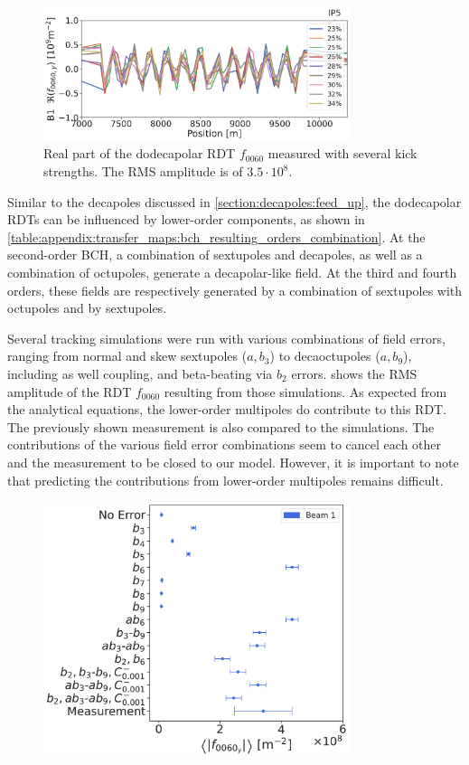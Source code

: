 \begin{figure}[!htb]
    \centering
    \includegraphics[width=0.8\textwidth]{./images/f0060y_all_meas_real.pdf}
    \caption{Real part of the dodecapolar RDT $f_{0060}$ measured with several kick strengths. The
    RMS amplitude is of $3.5\cdot10^{8}$.}
    \label{fig:high_orders:dodecapolar_f0060}
\end{figure}

Similar to the decapoles discussed in \cref{section:decapoles:feed_up}, the dodecapolar RDTs can be
influenced by lower-order components, as shown in
\cref{table:appendix:transfer_maps:bch_resulting_orders_combination}. At the second-order BCH, a
combination of sextupoles and decapoles, as well as a combination of octupoles, generate a
decapolar-like field. At the third and fourth orders, these fields are respectively generated by a
combination of sextupoles with octupoles and by sextupoles.

Several tracking simulations were run with various combinations of field errors, ranging from normal
and skew sextupoles ($a,b_3$) to decaoctupoles ($a,b_9$), including as well coupling, and
beta-beating via $b_2$ errors.  shows the RMS amplitude of
the RDT $f_{0060}$ resulting from those simulations. As expected from the analytical equations, the
lower-order multipoles do contribute to this RDT. The previously shown measurement is also compared
to the simulations. The contributions of the various field error combinations seem to cancel each
other and the measurement to be closed to our model. However, it is important to note that
predicting the contributions from lower-order multipoles remains difficult.

\begin{figure}[!htb]
    \centering
    \includegraphics[width=0.8\textwidth]{./images/simulations_f0060.pdf}
    \caption{}
    \label{fig:high_orders:simulations_f0060}
\end{figure}

